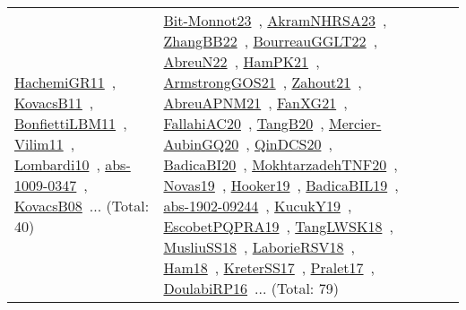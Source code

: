 {\begin{longtable}{lp{3cm}>{\raggedright\arraybackslash}p{6cm}>{\raggedright\arraybackslash}p{6cm}>{\raggedright\arraybackslash}p{8cm}}
\href{works/HachemiGR11.pdf}{HachemiGR11}~\cite{HachemiGR11}, \href{works/KovacsB11.pdf}{KovacsB11}~\cite{KovacsB11}, \href{works/BonfiettiLBM11.pdf}{BonfiettiLBM11}~\cite{BonfiettiLBM11}, \href{works/Vilim11.pdf}{Vilim11}~\cite{Vilim11}, \href{works/Lombardi10.pdf}{Lombardi10}~\cite{Lombardi10}, \href{works/abs-1009-0347.pdf}{abs-1009-0347}~\cite{abs-1009-0347}, \href{works/KovacsB08.pdf}{KovacsB08}~\cite{KovacsB08}... (Total: 40) & \href{works/Bit-Monnot23.pdf}{Bit-Monnot23}~\cite{Bit-Monnot23}, \href{works/AkramNHRSA23.pdf}{AkramNHRSA23}~\cite{AkramNHRSA23}, \href{works/ZhangBB22.pdf}{ZhangBB22}~\cite{ZhangBB22}, \href{works/BourreauGGLT22.pdf}{BourreauGGLT22}~\cite{BourreauGGLT22}, \href{works/AbreuN22.pdf}{AbreuN22}~\cite{AbreuN22}, \href{works/HamPK21.pdf}{HamPK21}~\cite{HamPK21}, \href{works/ArmstrongGOS21.pdf}{ArmstrongGOS21}~\cite{ArmstrongGOS21}, \href{works/Zahout21.pdf}{Zahout21}~\cite{Zahout21}, \href{works/AbreuAPNM21.pdf}{AbreuAPNM21}~\cite{AbreuAPNM21}, \href{works/FanXG21.pdf}{FanXG21}~\cite{FanXG21}, \href{works/FallahiAC20.pdf}{FallahiAC20}~\cite{FallahiAC20}, \href{works/TangB20.pdf}{TangB20}~\cite{TangB20}, \href{works/Mercier-AubinGQ20.pdf}{Mercier-AubinGQ20}~\cite{Mercier-AubinGQ20}, \href{works/QinDCS20.pdf}{QinDCS20}~\cite{QinDCS20}, \href{works/BadicaBI20.pdf}{BadicaBI20}~\cite{BadicaBI20}, \href{works/MokhtarzadehTNF20.pdf}{MokhtarzadehTNF20}~\cite{MokhtarzadehTNF20}, \href{works/Novas19.pdf}{Novas19}~\cite{Novas19}, \href{works/Hooker19.pdf}{Hooker19}~\cite{Hooker19}, \href{works/BadicaBIL19.pdf}{BadicaBIL19}~\cite{BadicaBIL19}, \href{works/abs-1902-09244.pdf}{abs-1902-09244}~\cite{abs-1902-09244}, \href{works/KucukY19.pdf}{KucukY19}~\cite{KucukY19}, \href{works/EscobetPQPRA19.pdf}{EscobetPQPRA19}~\cite{EscobetPQPRA19}, \href{works/TangLWSK18.pdf}{TangLWSK18}~\cite{TangLWSK18}, \href{works/MusliuSS18.pdf}{MusliuSS18}~\cite{MusliuSS18}, \href{works/LaborieRSV18.pdf}{LaborieRSV18}~\cite{LaborieRSV18}, \href{works/Ham18.pdf}{Ham18}~\cite{Ham18}, \href{works/KreterSS17.pdf}{KreterSS17}~\cite{KreterSS17}, \href{works/Pralet17.pdf}{Pralet17}~\cite{Pralet17}, \href{works/DoulabiRP16.pdf}{DoulabiRP16}~\cite{DoulabiRP16}... (Total: 79)\\

\end{longtable}}
